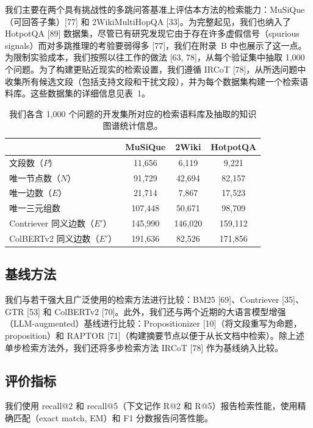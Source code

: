 \documentclass[11pt,UTF8,fontset=fandol]{ctexart}
\begin{document}
我们主要在两个具有挑战性的多跳问答基准上评估本方法的检索能力：MuSiQue（可回答子集）[77] 和 2WikiMultiHopQA [33]。为完整起见，我们也纳入了 HotpotQA [89] 数据集，尽管已有研究发现它由于存在许多虚假信号（spurious signals）而对多跳推理的考验要弱得多 [77]，我们在附录~B 中也展示了这一点。为限制实验成本，我们按照以往工作的做法 [63, 78]，从每个验证集中抽取 1,000 个问题。为了构建更贴近现实的检索设置，我们遵循 IRCoT [78]，从所选问题中收集所有候选文段（包括支持文段和干扰文段），并为每个数据集构建一个检索语料库。这些数据集的详细信息见表~1。

\begin{table}[H]\centering
\caption{我们各含 1,000 个问题的开发集所对应的检索语料库及抽取的知识图谱统计信息。}
\label{tab:1}
\begin{tabular}{lccc}
\toprule
 & MuSiQue & 2Wiki & HotpotQA \\
\midrule
文段数（$P$） & 11{,}656 & 6{,}119 & 9{,}221 \\
唯一节点数（$N$） & 91{,}729 & 42{,}694 & 82{,}157 \\
唯一边数（$E$） & 21{,}714 & 7{,}867 & 17{,}523 \\
唯一三元组数 & 107{,}448 & 50{,}671 & 98{,}709 \\
Contriever 同义边数（$E'$） & 145{,}990 & 146{,}020 & 159{,}112 \\
ColBERTv2 同义边数（$E'$） & 191{,}636 & 82{,}526 & 171{,}856 \\
\bottomrule
\end{tabular}
\end{table}

\subsection{基线方法}

我们与若干强大且广泛使用的检索方法进行比较：BM25 [69]、Contriever [35]、GTR [53] 和 ColBERTv2 [70]。此外，我们还与两个近期的大语言模型增强（LLM-augmented）基线进行比较：Propositionizer [10]（将文段重写为命题，proposition）和 RAPTOR [71]（构建摘要节点以便于从长文档中检索）。除上述单步检索方法外，我们还将多步检索方法 IRCoT [78] 作为基线纳入比较。

\subsection{评价指标}

我们使用 recall@2 和 recall@5（下文记作 R@2 和 R@5）报告检索性能，使用精确匹配（exact match, EM）和 F1 分数报告问答性能。
\end{document}
